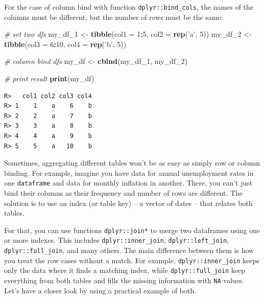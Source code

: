 \documentclass[
  12pt,
]{book}
\newenvironment{Shaded}{\begin{snugshade}}{\end{snugshade}}
\newcommand{\CommentTok}[1]{\textcolor[rgb]{0.37,0.37,0.37}{\textit{#1}}}
\newcommand{\DataTypeTok}[1]{\textcolor[rgb]{0.27,0.27,0.27}{#1}}
\newcommand{\DecValTok}[1]{\textcolor[rgb]{0.06,0.06,0.06}{#1}}
\newcommand{\KeywordTok}[1]{\textcolor[rgb]{0.27,0.27,0.27}{\textbf{#1}}}
\newcommand{\NormalTok}[1]{#1}
\newcommand{\OperatorTok}[1]{\textcolor[rgb]{0.43,0.43,0.43}{\textbf{#1}}}
\newcommand{\StringTok}[1]{\textcolor[rgb]{0.5,0.5,0.5}{#1}}
\begin{document}
For the case of column bind with function \texttt{dplyr::bind\_cols}, the names of the columns must be different, but the number of rows must be the same: 

\begin{Shaded}
\begin{Highlighting}[]
\CommentTok{# set two dfs}
\NormalTok{my_df_}\DecValTok{1}\NormalTok{ <-}\StringTok{ }\KeywordTok{tibble}\NormalTok{(}\DataTypeTok{col1 =} \DecValTok{1}\OperatorTok{:}\DecValTok{5}\NormalTok{, }
                  \DataTypeTok{col2 =} \KeywordTok{rep}\NormalTok{(}\StringTok{'a'}\NormalTok{, }\DecValTok{5}\NormalTok{))}
\NormalTok{my_df_}\DecValTok{2}\NormalTok{ <-}\StringTok{ }\KeywordTok{tibble}\NormalTok{(}\DataTypeTok{col3 =} \DecValTok{6}\OperatorTok{:}\DecValTok{10}\NormalTok{, }
                  \DataTypeTok{col4 =} \KeywordTok{rep}\NormalTok{(}\StringTok{'b'}\NormalTok{, }\DecValTok{5}\NormalTok{))}

\CommentTok{# column bind dfs}
\NormalTok{my_df <-}\StringTok{ }\KeywordTok{cbind}\NormalTok{(my_df_}\DecValTok{1}\NormalTok{, my_df_}\DecValTok{2}\NormalTok{)}

\CommentTok{# print result}
\KeywordTok{print}\NormalTok{(my_df)}
\end{Highlighting}
\end{Shaded}

\begin{verbatim}
R>   col1 col2 col3 col4
R> 1    1    a    6    b
R> 2    2    a    7    b
R> 3    3    a    8    b
R> 4    4    a    9    b
R> 5    5    a   10    b
\end{verbatim}

Sometimes, aggregating different tables won't be as easy as simply row or column binding. For example, imagine you have data for annual unemployment rates in one \texttt{dataframe} and data for monthly inflation in another. There, you can't just bind their columns as their frequency and number of rows are different. The solution is to use an index (or table key) -- a vector of dates -- that relates both tables.

For that, you can use functions \texttt{dplyr::join*} to merge two dataframes using one or more indexes. This includes \texttt{dplyr::inner\_join}, \texttt{dplyr::left\_join}, \texttt{dplyr::full\_join}, and many others. The main difference between them is how you treat the row cases without a match. For example, \texttt{dplyr::inner\_join} keeps only the data where it finds a matching index, while \texttt{dplyr::full\_join} keep everything from both tables and fills the missing information with \texttt{NA} values. Let's have a closer look by using a practical example of both.
\end{document}
